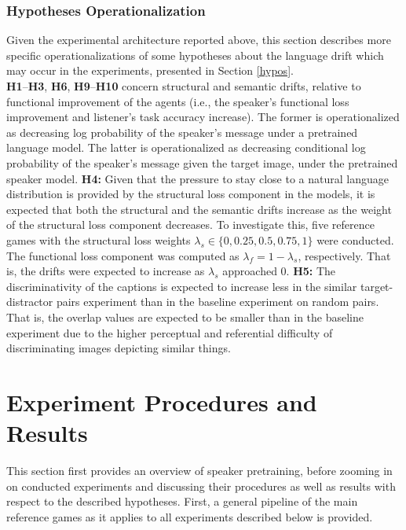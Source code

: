 \subsubsection{Hypotheses Operationalization}
Given the experimental architecture reported above, this section describes more specific operationalizations of some hypotheses about the language drift which may occur in the experiments, presented in Section \ref{hypos}.\\
\newline
\textbf{H1}--\textbf{H3}, \textbf{H6}, \textbf{H9}--\textbf{H10} concern structural and semantic drifts, relative to functional improvement of the agents (i.e., the speaker's functional loss improvement and listener's task accuracy increase). The former is operationalized as decreasing log probability of the speaker's message under a pretrained language model. The latter is operationalized as decreasing conditional log probability of the speaker's message given the target image, under the pretrained speaker model. \newline
\textbf{H4:} Given that the pressure to stay close to a natural language distribution is provided by the structural loss component in the models, it is expected that both the structural and the semantic drifts increase as the weight of the structural loss component decreases. To investigate this, five reference games with the structural loss weights $\lambda_s \in \{0, 0.25, 0.5, 0.75, 1\}$ were conducted. The functional loss component was computed as $\lambda_f = 1 - \lambda_s$, respectively. That is, the drifts were expected to increase as $\lambda_s$ approached 0.\newline
\textbf{H5:} The discriminativity of the captions is expected to increase less in the similar target-distractor pairs experiment than in the baseline experiment on random pairs. That is, the overlap values are expected to be smaller than in the baseline experiment due to the higher perceptual and referential difficulty of discriminating images depicting similar things. 

\section{Experiment Procedures and Results}

This section first provides an overview of speaker pretraining, before zooming in on conducted experiments and discussing their procedures as well as results with respect to the described hypotheses.
First, a general pipeline of the main reference games as it applies to all experiments described below is provided.

